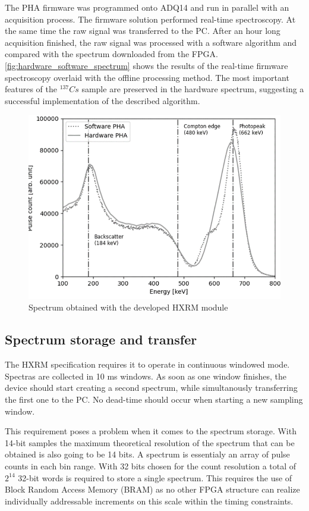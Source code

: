 The PHA firmware was programmed onto ADQ14 and run in parallel
with an acquisition process. The firmware solution performed real-time
spectroscopy. At the same time the raw signal was transferred to the PC.
After an hour long acquisition finished, the raw signal was processed 
with a software algorithm and compared with the spectrum downloaded from the FPGA.
\autoref{fig:hardware_software_spectrum}
shows the results of the real-time firmware spectroscopy overlaid
with the offline processing method. The most important features
of the $^137 Cs$ sample are preserved in the hardware spectrum,
suggesting a successful implementation of the described algorithm.

\begin{figure}[H]
  \centering
  \includegraphics[width=\linewidth]{media/hardware_software_spectrum.png}
  \caption{Spectrum obtained with the developed HXRM module}
  \label{fig:hardware_software_spectrum} 
\end{figure}

\subsection{Spectrum storage and transfer}

The HXRM specification requires it to operate in continuous windowed mode.
Spectras are collected in 10 ms windows. As soon as one window finishes,
the device should start creating a second spectrum, while simultanously 
transferring the first one to the PC. No dead-time should occur 
when starting a new sampling window.


This requirement poses a problem when it comes to the spectrum storage.
With 14-bit samples the maximum theoretical resolution of the spectrum
that can be obtained is also going to be 14 bits. A spectrum is essentialy 
an array of pulse counts in each bin range. With 32 bits chosen 
for the count resolution a total of $2^{14}$ 32-bit words is required to 
store a single spectrum.
This requires the use of Block Random Access Memory (BRAM) as no other FPGA structure can realize
individually addressable increments on this scale within the timing constraints.


